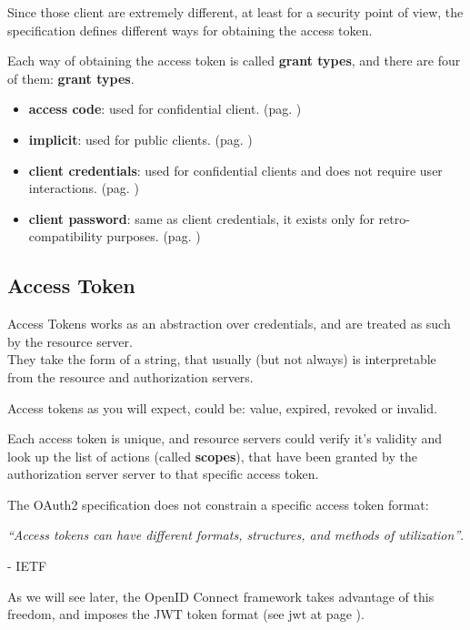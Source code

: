 Since those client are extremely different, at least for a security point of
view, the specification defines different ways for obtaining the access token.

Each way of obtaining the access token is called \textbf{grant types}, and
there are four of them:
\textbf{grant types}.
\begin{itemize}
    \item
        \textbf{access code}: used for confidential client. (pag. \pageref{sec:auth-code})
    \item
        \textbf{implicit}: used for public clients. (pag. \pageref{sec:implicit})
    \item
        \textbf{client credentials}: used for confidential clients and does not
        require user interactions. (pag. \pageref{sec:client-credentials})
    \item
        \textbf{client password}: same as client credentials, it exists only
        for retro-compatibility purposes. (pag. \pageref{sec:grant-password})
\end{itemize}

\subsection{Access Token}
Access Tokens works as an abstraction over credentials, and are treated as such
by the resource server.
\\
They take the form of a string, that usually (but not always) is interpretable
from the resource and authorization servers.

Access tokens as you will expect, could be: value, expired, revoked or invalid.

Each access token is unique, and resource servers could verify it's validity and
look up the list of actions (called \textbf{scopes}), that have been granted
by the authorization server server to that specific access token.

The OAuth2 specification does not constrain a specific access token format:

\begin{center}
\textit{``Access tokens can have different formats, structures, and methods of
utilization''}.
\end{center}
\begin{flushright}
    - IETF \cite{ietf-oauth}
\end{flushright}

As we will see later, the OpenID Connect framework takes advantage of this
freedom, and imposes the JWT token format (see \ac{jwt} at page \pageref{jwt}).


